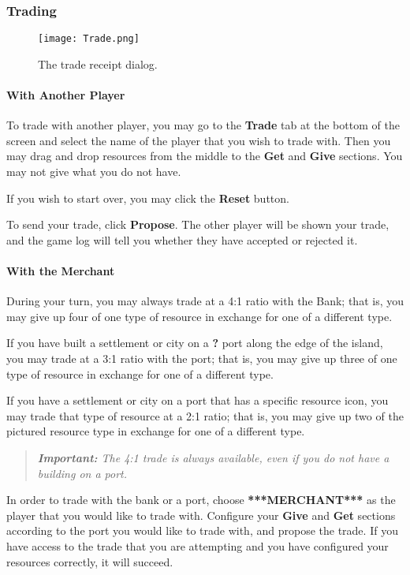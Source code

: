 \documentclass[12pt,letterpaper,titlepage]{article}
\newcommand\note[1]{\begin{quote}\emph{\textbf{Important:} #1}\end{quote}}
\begin{document}
		\subsubsection{Trading}
		\begin{figure}[h]
			\begin{center}
				\texttt{[image: Trade.png]}
			\end{center}
			\caption{The trade receipt dialog.}
		\end{figure}
			\paragraph{With Another Player}
			To trade with another player, you may go to the \textbf{Trade} tab at the bottom of the screen and select the name of the player that you wish to trade with. Then you may drag and drop resources from the middle to the \textbf{Get} and \textbf{Give} sections. You may not give what you do not have.
		
			If you wish to start over, you may click the \textbf{Reset} button.
		
			To send your trade, click \textbf{Propose}. The other player will be shown your trade, and the game log will tell you whether they have accepted or rejected it.
		
			\paragraph{With the Merchant}
			During your turn, you may always trade at a 4:1 ratio with the Bank; that is, you may give up four of one type of resource in exchange for one of a different type.
		
			If you have built a settlement or city on a \textbf{?} port along the edge of the island, you may trade at a 3:1 ratio with the port; that is, you may give up three of one type of resource in exchange for one of a different type.
		
			If you have a settlement or city on a port that has a specific resource icon, you may trade that type of resource at a 2:1 ratio; that is, you may give up two of the pictured resource type in exchange for one of a different type.
		
			\note{The 4:1 trade is always available, even if you do not have a building on a port.}
		
			In order to trade with the bank or a port, choose \textbf{***MERCHANT***} as the player that you would like to trade with. Configure your \textbf{Give} and \textbf{Get} sections according to the port you would like to trade with, and propose the trade. If you have access to the trade that you are attempting and you have configured your resources correctly, it will succeed.
\end{document}
